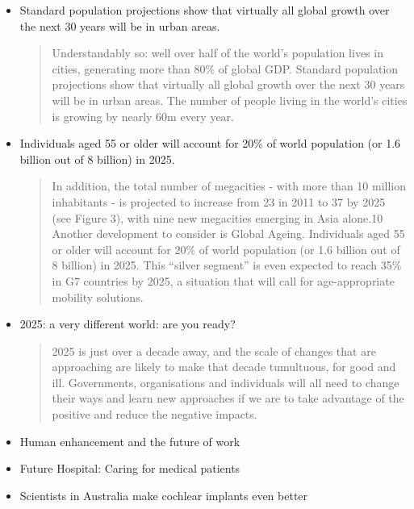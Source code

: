\begin{itemize}
\begin{quotation}
The UK Government is committed to grasping this opportunity. Our vision is that by 2050 almost every car and van in the UK will be an ultra low emission vehicle (ULEV), with the UK at the forefront of their design, development and manufacture, making us one of the most attractive locations for ULEV-related inward investment in the world. Context - the inevitable transition 3.\end{quotation}
\item Standard population projections show that virtually all global growth over the next 30 years will be in urban areas.
\begin{quotation}
Understandably so: well over half of the world's population lives in cities, generating more than 80\% of global GDP. Standard population projections show that virtually all global growth over the next 30 years will be in urban areas. The number of people living in the world's cities is growing by nearly 60m every year.\end{quotation}
\item Individuals aged 55 or older will account for 20\% of world population (or 1.6 billion out of 8 billion) in 2025.	
\begin{quotation}
In addition, the total number of megacities - with more than 10 million inhabitants - is projected to increase from 23 in 2011 to 37 by 2025 (see Figure 3), with nine new megacities emerging in Asia alone.10 Another development to consider is Global Ageing. Individuals aged 55 or older will account for 20\% of world population (or 1.6 billion out of 8 billion) in 2025. This ``silver segment'' is even expected to reach 35\% in G7 countries by 2025, a situation that will call for age-appropriate mobility solutions.\end{quotation}
\item 2025: a very different world: are you ready?
\begin{quotation}
2025 is just over a decade away, and the scale of changes that are approaching are likely to make that decade tumultuous, for good and ill. Governments, organisations and individuals will all need to change their ways and learn new approaches if we are to take advantage of the positive and reduce the negative impacts.\end{quotation}
\item Human enhancement and the future of work
\item Future Hospital: Caring for medical patients
\item Scientists in Australia make cochlear implants even better

\end{itemize}
